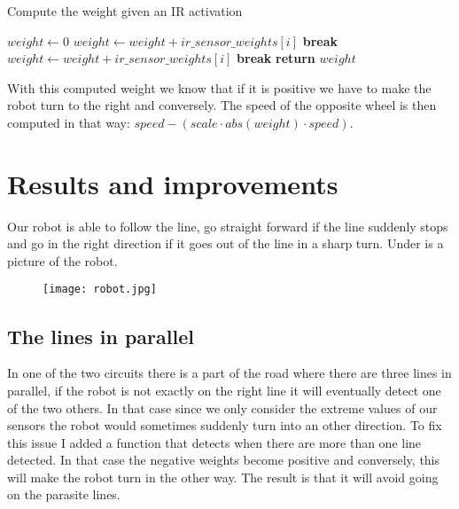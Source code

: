 \FloatBarrier
\begin{algorithm}
    \caption{Compute the weight given an IR activation}
    \label{compute_ir_weight}
    \begin{algorithmic}[1]
            \State $weight \gets 0$
                    \State $weight \gets weight + ir\_sensor\_weights[i]$
                    \State \textbf{break}
                \EndIf
            \EndFor
                    \State $weight \gets weight + ir\_sensor\_weights[i]$
                    \State \textbf{break}
                \EndIf
            \EndFor
            \State \textbf{return} $weight$
        \EndProcedure
    \end{algorithmic}
\end{algorithm}
\FloatBarrier

With this computed weight we know that if it is positive we have to make the robot turn to the right and conversely.
The speed of the opposite wheel is then computed in that way: $speed - (scale \cdot abs(weight) \cdot speed)$.

\section*{Results and improvements}

Our robot is able to follow the line, go straight forward if the line suddenly stops and go in the right direction if it goes out of the line in a sharp turn.
Under is a picture of the robot.

\begin{figure}[h]
    \centering\texttt{[image: robot.jpg]}
\end{figure}

\subsection*{The lines in parallel}

In one of the two circuits there is a part of the road where there are three lines in parallel, if the robot is not exactly on the right line it will eventually detect one of the two others.
In that case since we only consider the extreme values of our sensors the robot would sometimes suddenly turn into an other direction.
To fix this issue I added a function that detects when there are more than one line detected.
In that case the negative weights become positive and conversely, this will make the robot turn in the other way.
The result is that it will avoid going on the parasite lines.

